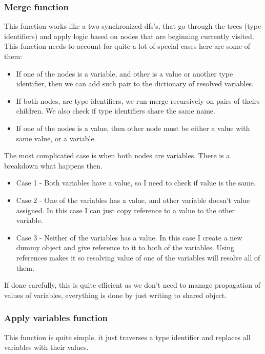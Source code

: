 \documentclass[14pt]{report}
\begin{document}
\subsubsection{Merge function}
This function works like a two synchronized dfs's, that go through the trees (type identifiers) and apply logic based on nodes that are beginning currently visited.
This function needs to account for quite a lot of special cases here are some of them:
\begin{itemize}
    \item If one of the nodes is a variable, and other is a value or another type identifier, then we can add such pair to the dictionary of resolved variables.
    \item If both nodes, are type identifiers, we run merge recursively on pairs of theirs children. We also check if type identifiers share the same name.
    \item If one of the nodes is a value, then other node must be either a value with same value, or a variable.
\end{itemize}
The most complicated case is when both nodes are variables. There is a breakdown what happens then. 
\begin{itemize}
    \item Case 1 - Both variables have a value, so I need to check if value is the same.
    \item Case 2 - One of the variables has a value, and other variable doesn't value assigned. In this case I can just copy reference to a value to the other variable.
    \item Case 3 - Neither of the variables has a value. In this case I create a new dummy object and give reference to it to both of the variables. Using references makes it so resolving value of one of the variables will resolve all of them. 
\end{itemize}
If done carefully, this is quite efficient as we don't need to manage propagation of values of variables, everything is done by just writing to shared object.

\subsubsection{Apply variables function}
This function is quite simple, it just traverses a type identifier and replaces all variables with their values.
\end{document}
